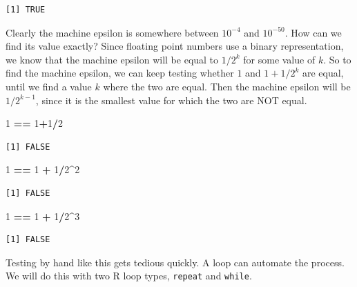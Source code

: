 \documentclass[
]{krantz}
\makeatletter
\newenvironment{Shaded}{\begin{snugshade}}{\end{snugshade}}
\newcommand{\DecValTok}[1]{\textcolor[rgb]{0.06,0.06,0.06}{#1}}
\newcommand{\OperatorTok}[1]{\textcolor[rgb]{0.43,0.43,0.43}{\textbf{#1}}}
\newcommand{\StringTok}[1]{\textcolor[rgb]{0.5,0.5,0.5}{#1}}
\newenvironment{kframe}{%
\medskip{}
\setlength{\fboxsep}{.8em}
 \def\at@end@of@kframe{}%
 \ifinner\ifhmode%
  \def\at@end@of@kframe{\end{minipage}}%
  \begin{minipage}{\columnwidth}%
 \fi\fi%
 \def\FrameCommand##1{\hskip\@totalleftmargin \hskip-\fboxsep
 \colorbox{shadecolor}{##1}\hskip-\fboxsep
     \hskip-\linewidth \hskip-\@totalleftmargin \hskip\columnwidth}%
 \MakeFramed {\advance\hsize-\width
   \@totalleftmargin\z@ \linewidth\hsize
   \@setminipage}}%
 {\par\unskip\endMakeFramed%
 \at@end@of@kframe}
\renewenvironment{Shaded}{\begin{kframe}}{\end{kframe}}
\makeatother
\begin{document}
\begin{verbatim}
[1] TRUE
\end{verbatim}

Clearly the machine epsilon is somewhere between \(10^{-4}\) and \(10^{-50}\). How can we find its value exactly? Since floating point numbers use a binary representation, we know that the machine epsilon will be equal to \(1/2^k\) for some value of \(k\). So to find the machine epsilon, we can keep testing whether \(1\) and \(1+1/2^k\) are equal, until we find a value \(k\) where the two are equal. Then the machine epsilon will be \(1/2^{k-1}\), since it is the smallest value for which the two are NOT equal.

\begin{Shaded}
\begin{Highlighting}[]
\DecValTok{1} \OperatorTok{==}\StringTok{ }\DecValTok{1}\OperatorTok{+}\DecValTok{1}\OperatorTok{/}\DecValTok{2}
\end{Highlighting}
\end{Shaded}

\begin{verbatim}
[1] FALSE
\end{verbatim}

\begin{Shaded}
\begin{Highlighting}[]
\DecValTok{1} \OperatorTok{==}\StringTok{ }\DecValTok{1} \OperatorTok{+}\StringTok{ }\DecValTok{1}\OperatorTok{/}\DecValTok{2}\OperatorTok{\^{}}\DecValTok{2}
\end{Highlighting}
\end{Shaded}

\begin{verbatim}
[1] FALSE
\end{verbatim}

\begin{Shaded}
\begin{Highlighting}[]
\DecValTok{1} \OperatorTok{==}\StringTok{ }\DecValTok{1} \OperatorTok{+}\StringTok{ }\DecValTok{1}\OperatorTok{/}\DecValTok{2}\OperatorTok{\^{}}\DecValTok{3}
\end{Highlighting}
\end{Shaded}

\begin{verbatim}
[1] FALSE
\end{verbatim}

Testing by hand like this gets tedious quickly. A loop can automate the process. We will do this with two R loop types, \texttt{repeat} and \texttt{while}.
\end{document}
